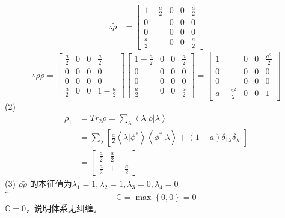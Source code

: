 \documentclass[12pt]{article}
\numberwithin{equation}{section}	 %
\begin{document}
\begin{spacing}{1.5}
\begin{align*}
\therefore \tilde{\rho} &= \begin{bmatrix} \displaystyle 1-\frac{a}{2} & 0 & 0 & \displaystyle \frac{a}{2} \\ 0 & 0 & 0 & 0 \\ 0 & 0 & 0 & 0 \\ \displaystyle \frac{a}{2} & 0 & 0 & \displaystyle \frac{a}{2} \end{bmatrix}
\end{align*}
\begin{equation}\nonumber 		%
\therefore \rho\tilde\rho = \begin{bmatrix} \displaystyle \frac{a}{2} & 0 & 0 & \displaystyle \frac{a}{2} \\ 0 & 0 & 0 & 0 \\ 0 & 0 & 0 & 0 \\ \displaystyle \frac{a}{2} & 0 & 0 & \displaystyle 1-\frac{a}{2} \end{bmatrix}  \begin{bmatrix} \displaystyle 1-\frac{a}{2} & 0 & 0 & \displaystyle \frac{a}{2} \\ 0 & 0 & 0 & 0 \\ 0 & 0 & 0 & 0 \\ \displaystyle \frac{a}{2} & 0 & 0 & \displaystyle \frac{a}{2} \end{bmatrix} = \begin{bmatrix} \displaystyle 1 & 0 & 0 & \displaystyle \frac{a^{2}}{2} \\ 0 & 0 & 0 & 0 \\ 0 & 0 & 0 & 0 \\ \displaystyle a-\frac{a^{2}}{2} & 0 & 0 & \displaystyle 1 \end{bmatrix}
\end{equation}
(2) 
\begin{align*}
\rho_{1} &= Tr_{2}\rho = \sum_{\lambda}\left<\lambda\left|\rho\right|\lambda\right> \\
&= \sum_{\lambda} \left[\frac{a}{2}\left<\lambda|\phi^{*}\right>\left<\phi^{*}|\lambda\right> + (1-a)\delta_{1\lambda}\delta_{\lambda1}\right] \\
&= \begin{bmatrix} \displaystyle \frac{a}{2} & \displaystyle \frac{a}{2} \\ \displaystyle \frac{a}{2} & \displaystyle 1-\frac{a}{2} \end{bmatrix}
\end{align*}
(3) $\rho\tilde\rho$ 的本征值为$\displaystyle \lambda_{1}=1,\lambda_{2}=1,\lambda_{3}=0,\lambda_{4}=0$ \\
$\therefore$
\begin{equation}
\mathbb{C} = \max\left\{0,0\right\} = 0
\end{equation}
$\mathbb{C} = 0$，说明体系无纠缠。
\newpage

\end{spacing}
\end{document}
